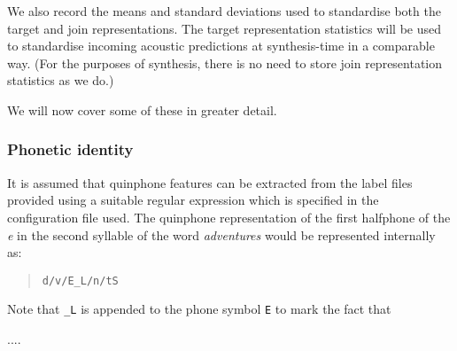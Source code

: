 We also record the means and standard deviations used to standardise both the target and join representations. The target representation statistics will be used to standardise incoming acoustic predictions at synthesis-time in a comparable way. (For the purposes of synthesis, there is no need to store join representation statistics as we do.) 



We will now cover some of these in greater detail.

\subsubsection{Phonetic identity}
It is assumed that quinphone features can be extracted from the label files provided using a suitable regular expression which is specified in the configuration file used. The quinphone representation of the first halfphone of the \textit{e} in the second syllable of the word \textit{adventures} would be represented internally as: 

\begin{quotation}
{\tt d/v/E\_L/n/tS } %
\end{quotation}

Note that {\tt \_L} is appended to the phone symbol {\tt E} to mark the fact that 

....

